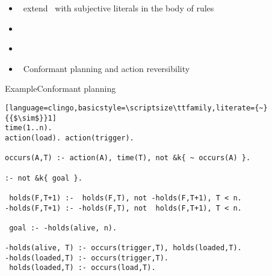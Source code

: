 \begin{frame}{\eclingo}
  \begin{itemize}
  \item {} \ extend \clingo\ with subjective literals in the body of rules
  \item {} \
  \item {} \ \cite{cafagarosc20a}
  \item {} \ Conformant planning \cite{cafafa21a} and action reversibility \cite{famoch21a}
  \end{itemize}
\end{frame}
\begin{frame}[fragile]{Example}{Conformant planning}
\begin{lstlisting}[language=clingo,basicstyle=\scriptsize\ttfamily,literate={~}{{$\sim$}}1]
time(1..n).
action(load). action(trigger).

occurs(A,T) :- action(A), time(T), not &k{ ~ occurs(A) }.

:- not &k{ goal }.

 holds(F,T+1) :-  holds(F,T), not -holds(F,T+1), T < n.
-holds(F,T+1) :- -holds(F,T), not  holds(F,T+1), T < n.

 goal :- -holds(alive, n).

-holds(alive, T) :- occurs(trigger,T), holds(loaded,T).
-holds(loaded,T) :- occurs(trigger,T).
 holds(loaded,T) :- occurs(load,T).
\end{lstlisting}
\end{frame}
%
